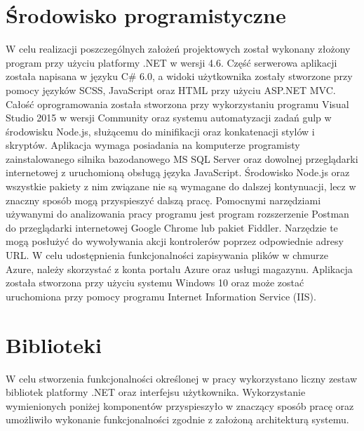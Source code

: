\section{Środowisko programistyczne}
W celu realizacji poszczególnych założeń projektowych został wykonany złożony program przy użyciu platformy .NET w wersji 4.6. Część serwerowa aplikacji została napisana w języku C\# 6.0, a widoki użytkownika zostały stworzone przy pomocy języków SCSS, JavaScript oraz HTML przy użyciu ASP.NET MVC. Całość oprogramowania została stworzona przy wykorzystaniu programu Visual Studio 2015 w wersji Community oraz systemu automatyzacji zadań gulp w środowisku Node.js, służącemu do minifikacji oraz konkatenacji stylów i skryptów. Aplikacja wymaga posiadania na komputerze programisty zainstalowanego silnika bazodanowego MS SQL Server oraz dowolnej przeglądarki internetowej z uruchomioną obsługą języka JavaScript. Środowisko Node.js oraz wszystkie pakiety z nim związane nie są wymagane do dalszej kontynuacji, lecz w znaczny sposób mogą przyspieszyć dalszą pracę. Pomocnymi narzędziami używanymi do analizowania pracy programu jest program rozszerzenie Postman do przeglądarki internetowej Google Chrome lub pakiet Fiddler. Narzędzie te mogą posłużyć do wywoływania akcji kontrolerów poprzez odpowiednie adresy URL. W celu udostępnienia funkcjonalności zapisywania plików w chmurze Azure, należy skorzystać z konta portalu Azure oraz usługi magazynu. Aplikacja została stworzona przy użyciu systemu Windows 10 oraz może zostać uruchomiona przy pomocy programu Internet Information Service (IIS).

\newpage

\section{Biblioteki}

W celu stworzenia funkcjonalności określonej w pracy wykorzystano liczny zestaw bibliotek platformy .NET oraz interfejsu użytkownika. Wykorzystanie wymienionych poniżej komponentów przyspieszyło w znaczący sposób pracę oraz umożliwiło wykonanie funkcjonalności zgodnie z założoną architekturą systemu.

